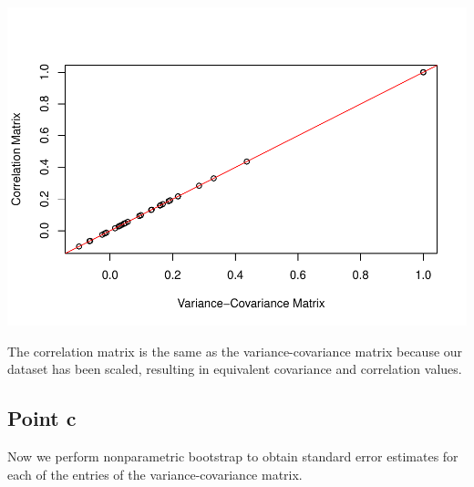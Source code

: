 \documentclass[
]{article}
\begin{document}
\includegraphics{ANUASS2TEST_files/figure-latex/unnamed-chunk-6-1.pdf}

The correlation matrix is the same as the variance-covariance matrix
because our dataset has been scaled, resulting in equivalent covariance
and correlation values.

\hypertarget{point-c}{%
\subsection{Point c}\label{point-c}}

Now we perform nonparametric bootstrap to obtain standard error
estimates for each of the entries of the variance-covariance matrix.
\end{document}
